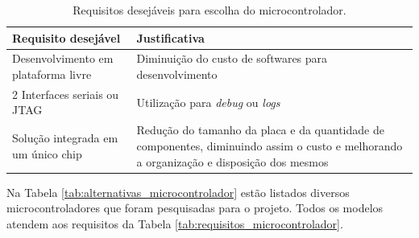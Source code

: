 \begin{table}[h]
  \caption{Requisitos desejáveis para escolha do microcontrolador.}
  \centering
  \begin{tabular}{p{7cm}|p{8cm}}
    \toprule
    \textbf{Requisito desejável} & \textbf{Justificativa} \\
    \hline
    Desenvolvimento em plataforma livre	 & Diminuição do custo de softwares para desenvolvimento \\
    \hline
    2 Interfaces seriais ou JTAG & Utilização para \textit{debug} ou \textit{logs} \\
    \hline
    Solução integrada em um único chip & Redução do tamanho da placa e da quantidade de componentes, diminuindo assim o custo e melhorando a organização e disposição dos mesmos \\
    \bottomrule
  \end{tabular}
  \label{tab:requisitos_desejaveis_microcontrolador}
\end{table}

Na Tabela \ref{tab:alternativas_microcontrolador} estão listados diversos microcontroladores que foram pesquisadas para o projeto. Todos os modelos atendem aos requisitos da Tabela \ref{tab:requisitos_microcontrolador}.

